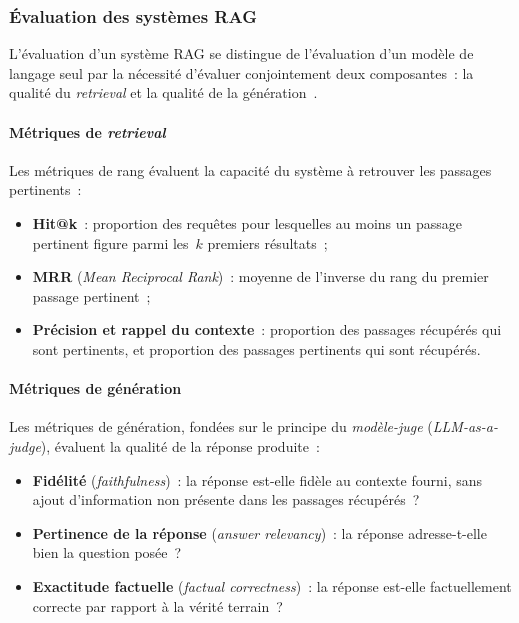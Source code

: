 \documentclass[11pt,a4paper]{article}
\begin{document}
\subsubsection{Évaluation des systèmes RAG}

L'évaluation d'un système RAG se distingue de l'évaluation d'un modèle de langage seul par la nécessité d'évaluer conjointement deux composantes~: la qualité du \textit{retrieval} et la qualité de la génération~\cite{es2024ragas}.

\paragraph{Métriques de \textit{retrieval}}

Les métriques de rang évaluent la capacité du système à retrouver les passages pertinents~:
\begin{itemize}
  \item \textbf{Hit@k}~: proportion des requêtes pour lesquelles au moins un passage pertinent figure parmi les~$k$ premiers résultats~;
  \item \textbf{MRR} (\textit{Mean Reciprocal Rank})~: moyenne de l'inverse du rang du premier passage pertinent~;
  \item \textbf{Précision et rappel du contexte}~: proportion des passages récupérés qui sont pertinents, et proportion des passages pertinents qui sont récupérés.
\end{itemize}

\paragraph{Métriques de génération}

Les métriques de génération, fondées sur le principe du \textit{modèle-juge} (\textit{LLM-as-a-judge}), évaluent la qualité de la réponse produite~:
\begin{itemize}
  \item \textbf{Fidélité} (\textit{faithfulness})~: la réponse est-elle fidèle au contexte fourni, sans ajout d'information non présente dans les passages récupérés~?
  \item \textbf{Pertinence de la réponse} (\textit{answer relevancy})~: la réponse adresse-t-elle bien la question posée~?
  \item \textbf{Exactitude factuelle} (\textit{factual correctness})~: la réponse est-elle factuellement correcte par rapport à la vérité terrain~?
\end{itemize}
\end{document}
